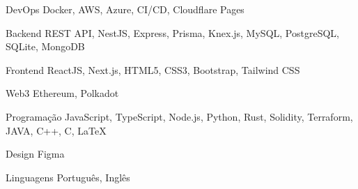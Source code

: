 

\begin{cvskills}

  \cvskill
    {DevOps} %
    {Docker, AWS, Azure, CI/CD, Cloudflare Pages} %

  \cvskill
    {Backend} %
    {REST API, NestJS, Express, Prisma, Knex.js, MySQL, PostgreSQL, SQLite, MongoDB} %

  \cvskill
    {Frontend} %
    {ReactJS, Next.js, HTML5, CSS3, Bootstrap, Tailwind CSS} %

  \cvskill
    {Web3} %
    {Ethereum, Polkadot} %

  \cvskill
    {Programação} %
    {JavaScript, TypeScript, Node.js, Python, Rust, Solidity, Terraform, JAVA, C++, C, LaTeX} %

  \cvskill
    {Design} %
    {Figma} %

  \cvskill
    {Linguagens} %
    {Português, Inglês} %

\end{cvskills}
